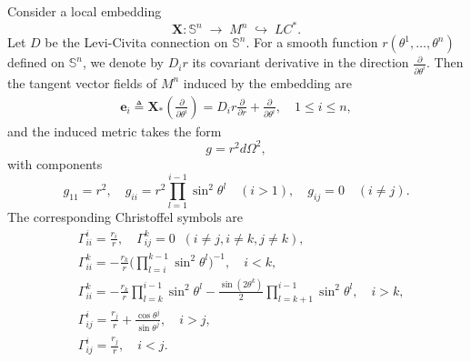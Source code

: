 \documentclass[reqno,11pt, letterpaper]{amsart}
\theoremstyle{plain}
\theoremstyle{definition}
\def\Bbb#1{{\mathbb#1}}
\def\S{\Bbb S}
\numberwithin{equation}{section}
\begin{document}
Consider a local embedding  
\[
\mathbf{X} : \S^n \;\rightarrow\; M^n \;\hookrightarrow\; LC^*.
\]
Let $D$ be the Levi-Civita connection on $\S^n$. 
For a smooth function 
$r(\theta^1,\ldots,\theta^n)$ defined on $\S^n$, we denote by $D_i r$ its covariant 
derivative in the direction $\displaystyle \frac{\partial}{\partial\theta^i}$. Then the tangent vector fields of $M^n$ induced by the embedding are
\begin{align*}
	\mathbf{e}_i \triangleq \mathbf{X}_*\left(\frac{\partial}{\partial \theta^i}\right)
	= D_i r \frac{\partial}{\partial r} + \frac{\partial}{\partial \theta^i}, \quad 1 \le i \le n,
\end{align*}
and the induced metric takes the form
\[
g = r^2 d\Omega^2,
\]
with components
\[
g_{11} = r^2, \quad g_{ii} = r^2 \prod_{l=1}^{i-1} \sin^2 \theta^l \quad (i>1), \quad g_{ij} = 0 \quad (i \neq j).
\]
The corresponding Christoffel symbols are
\begin{align*}
	&\Gamma^i_{ii} = \frac{r_i}{r}, 
	\quad \Gamma_{ij}^k = 0 \;\; (i \neq j, i \neq k, j \neq k), \\
	&\Gamma_{ii}^k = -\frac{r_k}{r} \Biggl(\prod_{l=i}^{k-1} \sin^2 \theta^l \Biggr)^{-1}, \quad i<k, \\
	&\Gamma_{ii}^k = -\frac{r_k}{r} \prod_{l=k}^{i-1} \sin^2 \theta^l - \frac{\sin(2\theta^k)}{2} \prod_{l=k+1}^{i-1} \sin^2 \theta^l, \quad i>k, \\
	&\Gamma_{ij}^i = \frac{r_j}{r} + \frac{\cos \theta^j}{\sin \theta^j}, \quad i>j, \\
	&\Gamma_{ij}^i = \frac{r_j}{r}, \quad i<j.
\end{align*}
\end{document}
